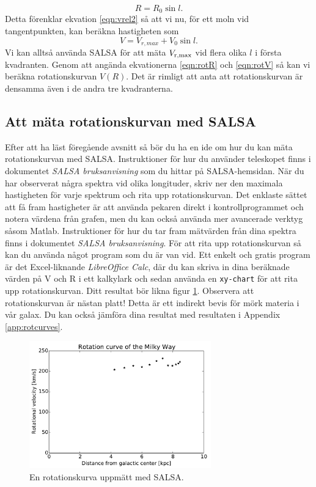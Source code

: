 \begin{equation}
	R = R_0 \sin l.
	\label{eqn:rotR}
\end{equation}
Detta förenklar ekvation \ref{eqn:vrel2} så att vi nu, för ett moln vid tangentpunkten,
kan beräkna hastigheten som
\begin{equation}
V = V_{r,max} + V_0 \sin l .
\label{eqn:rotV}
\end{equation}
Vi kan alltså använda SALSA för att mäta $V_{\rm r,max}$ vid flera
olika $l$ i första kvadranten.  Genom att angända ekvationerna \ref{eqn:rotR} och 
\ref{eqn:rotV} så kan vi beräkna rotationskurvan $V(R)$. 
Det är rimligt att anta att rotationskurvan är densamma även i de andra tre
kvadranterna. 

\subsection{Att mäta rotationskurvan med SALSA}
\label{sect:SALSArot}
Efter att ha läst föregående avsnitt så bör du ha en ide om hur du kan mäta
rotationskurvan med SALSA. Instruktioner för hur du använder teleskopet finns i
dokumentet \emph{SALSA bruksanvisning} som du hittar på SALSA-hemsidan.
När du har observerat några spektra vid olika longituder, skriv ner den
maximala hastigheten för varje spektrum och rita upp rotationskurvan.  Det
enklaste sättet att få fram hastigheter är att använda pekaren direkt i
kontrollprogrammet och notera värdena från grafen, men du kan också använda mer
avancerade verktyg såsom Matlab. Instruktioner för hur du tar fram mätvärden
från dina spektra finns i dokumentet \emph{SALSA bruksanvisning}.  För att rita
upp rotationskurvan så kan du använda något program som du är van vid. Ett
enkelt och gratis program är det Excel-liknande \emph{LibreOffice Calc}, 
där du kan skriva in dina beräknade värden på V och R i ett kalkylark och sedan 
använda en {\tt xy-chart} för att rita upp rotationskurvan. Ditt resultat
bör likna figur \ref{fig:rotfinal}. Observera att rotationskurvan är nästan platt!
Detta är ett indirekt bevis för mörk materia i vår galax. Du kan också jämföra dina resultat
med resultaten i Appendix \ref{app:rotcurves}.

\begin{figure}[t]
\begin{center}
\includegraphics[width=0.7\textwidth]{../figures/SALSA_rotcurve.pdf}
\caption{En rotationskurva uppmätt med SALSA.}
\label{fig:rotfinal}
\end{center}
\end{figure}

